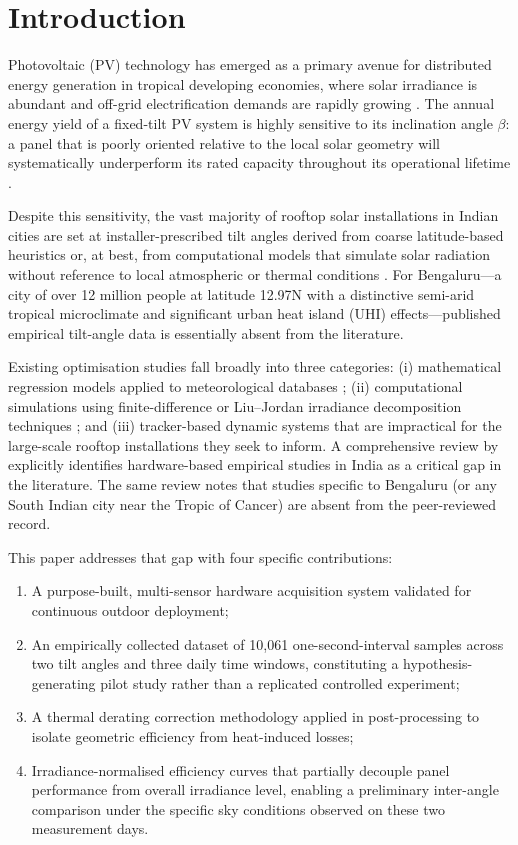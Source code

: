 \documentclass[conference]{IEEEtran}
\begin{document}
\section{Introduction}
\label{sec:intro}

Photovoltaic (PV) technology has emerged as a primary avenue for distributed energy generation
in tropical developing economies, where solar irradiance is abundant and off-grid electrification
demands are rapidly growing \cite{iea2023}. The annual energy yield of a fixed-tilt PV system
is highly sensitive to its inclination angle $\beta$: a panel that is poorly oriented relative
to the local solar geometry will systematically underperform its rated capacity throughout its
operational lifetime \cite{duffie2013}.

Despite this sensitivity, the vast majority of rooftop solar installations in Indian cities are
set at installer-prescribed tilt angles derived from coarse latitude-based heuristics or, at
best, from computational models that simulate solar radiation without reference to local
atmospheric or thermal conditions \cite{chakraborty2024}. For Bengaluru---a city of over
12 million people at latitude 12.97\degree{}N with a distinctive semi-arid tropical microclimate
and significant urban heat island (UHI) effects---published empirical tilt-angle data is
essentially absent from the literature.

Existing optimisation studies fall broadly into three categories: (i) mathematical regression
models applied to meteorological databases \cite{taylor2022}; (ii) computational simulations
using finite-difference or Liu--Jordan irradiance decomposition techniques
\cite{liu1963,badescu2008}; and (iii) tracker-based dynamic systems that are impractical for
the large-scale rooftop installations they seek to inform. A comprehensive review by
\cite{yadav2013} explicitly identifies hardware-based empirical studies in India as a critical
gap in the literature. The same review notes that studies specific to Bengaluru (or any South
Indian city near the Tropic of Cancer) are absent from the peer-reviewed record.

This paper addresses that gap with four specific contributions:
\begin{enumerate}
  \item A purpose-built, multi-sensor hardware acquisition system validated for continuous
        outdoor deployment;
  \item An empirically collected dataset of 10{,}061 one-second-interval samples across two
        tilt angles and three daily time windows, constituting a hypothesis-generating pilot
        study rather than a replicated controlled experiment;
  \item A thermal derating correction methodology applied in post-processing to isolate
        geometric efficiency from heat-induced losses;
  \item Irradiance-normalised efficiency curves that partially decouple panel performance from
        overall irradiance level, enabling a preliminary inter-angle comparison under the
        specific sky conditions observed on these two measurement days.
\end{enumerate}
\end{document}
